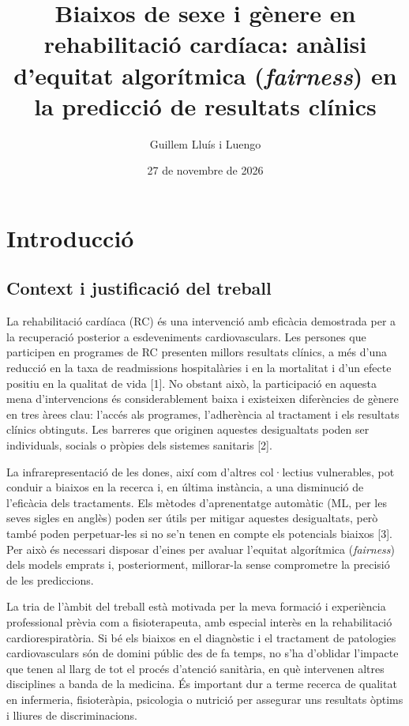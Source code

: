 \documentclass[CAT]{TFUOC}%
\title{Biaixos de sexe i gènere en rehabilitació cardíaca: anàlisi d'equitat algorítmica (\emph{fairness}) en la predicció de resultats clínics}
\author{Guillem Lluís i Luengo}
\date{27 de novembre de 2026}
\begin{document}
\estructura

\tableofcontents

\listoffigures

\listoftables

\chapter{Introducció}\label{introducciuxf3}

\section{Context i justificació del treball}\label{context-i-justificaciuxf3-del-treball}

La rehabilitació cardíaca (RC) és una intervenció amb eficàcia demostrada per a la recuperació posterior a esdeveniments cardiovasculars. Les persones que participen en programes de RC presenten millors resultats clínics, a més d'una reducció en la taxa de readmissions hospitalàries i en la mortalitat i d'un efecte positiu en la qualitat de vida {[}1{]}. No obstant això, la participació en aquesta mena d'intervencions és considerablement baixa i existeixen diferències de gènere en tres àrees clau: l'accés als programes, l'adherència al tractament i els resultats clínics obtinguts. Les barreres que originen aquestes desigualtats poden ser individuals, socials o pròpies dels sistemes sanitaris {[}2{]}.

La infrarepresentació de les dones, així com d'altres col·lectius vulnerables, pot conduir a biaixos en la recerca i, en última instància, a una disminució de l'eficàcia dels tractaments. Els mètodes d'aprenentatge automàtic (ML, per les seves sigles en anglès) poden ser útils per mitigar aquestes desigualtats, però també poden perpetuar-les si no se'n tenen en compte els potencials biaixos {[}3{]}. Per això és necessari disposar d'eines per avaluar l'equitat algorítmica (\emph{fairness}) dels models emprats i, posteriorment, millorar-la sense comprometre la precisió de les prediccions.

La tria de l'àmbit del treball està motivada per la meva formació i experiència professional prèvia com a fisioterapeuta, amb especial interès en la rehabilitació cardiorespiratòria. Si bé els biaixos en el diagnòstic i el tractament de patologies cardiovasculars són de domini públic des de fa temps, no s'ha d'oblidar l'impacte que tenen al llarg de tot el procés d'atenció sanitària, en què intervenen altres disciplines a banda de la medicina. És important dur a terme recerca de qualitat en infermeria, fisioteràpia, psicologia o nutrició per assegurar uns resultats òptims i lliures de discriminacions.
\end{document}
